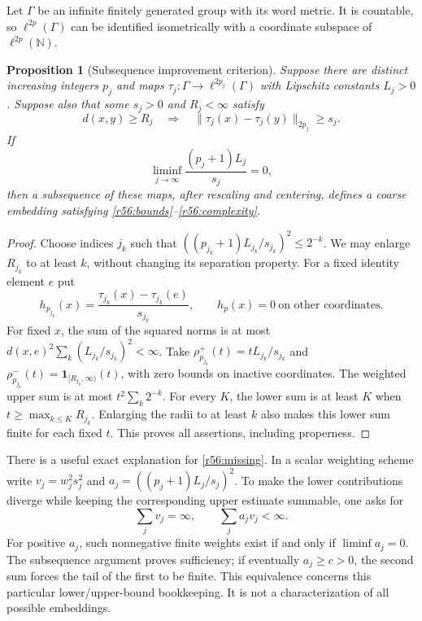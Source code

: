 \documentclass[11pt,a4paper]{article}
\newcommand{\N}{\mathbb{N}}
\newtheorem{notebookproposition}[notebooklemma]{Proposition}
\numberwithin{equation}{section}
\begin{document}
Let $\Gamma$ be an infinite finitely generated group with its word metric. It is countable, so $\ell^{2p}(\Gamma)$ can be identified isometrically with a coordinate subspace of $\ell^{2p}(\N)$.

\begin{notebookproposition}[Subsequence improvement criterion]\label{r56:selection}
Suppose there are distinct increasing integers $p_j$ and maps
$\tau_j:\Gamma\to\ell^{2p_j}(\Gamma)$ with Lipschitz constants $L_j>0$. Suppose also that some $s_j>0$ and $R_j<\infty$ satisfy
\[
 d(x,y)\geq R_j\quad\Longrightarrow\quad
       \|\tau_j(x)-\tau_j(y)\|_{2p_j}\geq s_j.
\]
If
\begin{equation}\label{r56:missing}
 \liminf_{j\to\infty}\frac{(p_j+1)L_j}{s_j}=0,
\end{equation}
then a subsequence of these maps, after rescaling and centering, defines a coarse embedding satisfying \eqref{r56:bounds}--\eqref{r56:complexity}.
\end{notebookproposition}
\begin{proof}
Choose indices $j_k$ such that
$((p_{j_k}+1)L_{j_k}/s_{j_k})^2\leq2^{-k}$. We may enlarge $R_{j_k}$ to at least $k$, without changing its separation property. For a fixed identity element $e$ put
\[
 h_{p_{j_k}}(x)=\frac{\tau_{j_k}(x)-\tau_{j_k}(e)}{s_{j_k}},
 \qquad h_p(x)=0\ \text{on other coordinates}.
\]
For fixed $x$, the sum of the squared norms is at most
$d(x,e)^2\sum_k(L_{j_k}/s_{j_k})^2<\infty$.
Take $\rho_{p_{j_k}}^+(t)=tL_{j_k}/s_{j_k}$ and
$\rho_{p_{j_k}}^-(t)=\mathbf1_{[R_{j_k},\infty)}(t)$, with zero bounds on inactive coordinates. The weighted upper sum is at most $t^2\sum_k2^{-k}$. For every $K$, the lower sum is at least $K$ when $t\geq\max_{k\leq K}R_{j_k}$. Enlarging the radii to at least $k$ also makes this lower sum finite for each fixed $t$. This proves all assertions, including properness.
\end{proof}

There is a useful exact explanation for \eqref{r56:missing}. In a scalar weighting scheme write
$v_j=w_j^2s_j^2$ and $a_j=((p_j+1)L_j/s_j)^2$. To make the lower contributions diverge while keeping the corresponding upper estimate summable, one asks for
\begin{equation}\label{r56:weights}
 \sum_jv_j=\infty,\qquad \sum_ja_jv_j<\infty.
\end{equation}
For positive $a_j$, such nonnegative finite weights exist if and only if
$\liminf a_j=0$. The subsequence argument proves sufficiency; if eventually $a_j\geq c>0$, the second sum forces the tail of the first to be finite. This equivalence concerns this particular lower/upper-bound bookkeeping. It is not a characterization of all possible embeddings.
\end{document}

